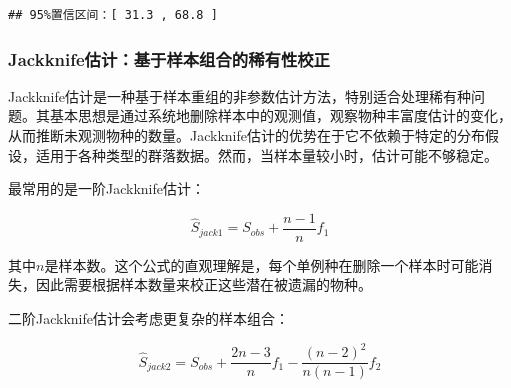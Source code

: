 \documentclass[
  twoside,12pt,fontset=none]{ctexbook}
\begin{document}
\begin{verbatim}
## 95%置信区间：[ 31.3 , 68.8 ]
\end{verbatim}

\hypertarget{jackknifeux4f30ux8ba1ux57faux4e8eux6837ux672cux7ec4ux5408ux7684ux7a00ux6709ux6027ux6821ux6b63}{%
\subsubsection{Jackknife估计：基于样本组合的稀有性校正}\label{jackknifeux4f30ux8ba1ux57faux4e8eux6837ux672cux7ec4ux5408ux7684ux7a00ux6709ux6027ux6821ux6b63}}

Jackknife估计是一种基于样本重组的非参数估计方法，特别适合处理稀有种问题。其基本思想是通过系统地删除样本中的观测值，观察物种丰富度估计的变化，从而推断未观测物种的数量。Jackknife估计的优势在于它不依赖于特定的分布假设，适用于各种类型的群落数据。然而，当样本量较小时，估计可能不够稳定。

最常用的是一阶Jackknife估计：

\[\hat{S}_{jack1} = S_{obs} + \frac{n-1}{n}f_1\]

其中\(n\)是样本数。这个公式的直观理解是，每个单例种在删除一个样本时可能消失，因此需要根据样本数量来校正这些潜在被遗漏的物种。

二阶Jackknife估计会考虑更复杂的样本组合：

\[\hat{S}_{jack2} = S_{obs} + \frac{2n-3}{n}f_1 - \frac{(n-2)^2}{n(n-1)}f_2\]
\end{document}

